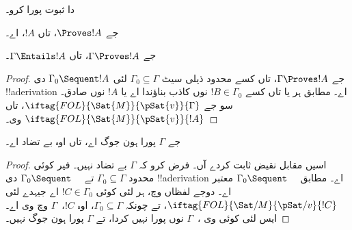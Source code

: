 \documentclass[../../../include/open-logic-section]{subfiles}
\begin{document}
\begin{prob}
 دا ثبوت پورا کرو۔
\end{prob}
\tagendprob

\begin{cor}
جے $\Proves !A$، تاں $!A$،  اے۔
\end{cor}

\begin{cor}
جے $\Gamma \Proves !A$، تاں $\Gamma \Entails !A$۔
\end{cor}

\begin{proof}
جے $\Gamma \Proves !A$، تاں کسے محدود ذیلی سیٹ $\Gamma_0 \subseteq
\Gamma$ لئی $\Gamma_0 \Sequent !A$ دی !!a{derivation} اے۔
 مطابق ہر
یا تاں کسے $!B \in \Gamma_0$ نوں کاذب بناؤندا اے یا $!A$ نوں صادق۔ سو
جے $\iftag{FOL}{\Sat{M}}{\pSat{v}}{\Gamma}$، تاں
$\iftag{FOL}{\Sat{M}}{\pSat{v}}{!A}$ وی۔
\end{proof}

\begin{cor}
جے $\Gamma$ پورا ہون جوگ اے، تاں اوہ بے تضاد اے۔
\end{cor}

\begin{proof}
اسیں مقابل نقیض ثابت کردے آں۔ فرض کرو کہ $\Gamma$ بے تضاد نہیں۔ فیر کوئی
محدود $\Gamma_0 \subseteq \Gamma$ تے $\Gamma_0 \Sequent \quad$ دی
!!a{derivation} اے۔  مطابق
$\Gamma_0 \Sequent \quad$ معتبر اے۔ دوجے لفظاں وچ، ہر
لئی کوئی $!C \in \Gamma_0$ اے جیہدے لئی
$\iftag{FOL}{\Sat/{M}}{\pSat/{v}}{!C}$، تے چونکہ $\Gamma_0
\subseteq \Gamma$، اوہ $!C$،~$\Gamma$ وچ وی اے۔ ایس لئی کوئی وی
،~$\Gamma$ نوں پورا نہیں کردا،
تے $\Gamma$ پورا ہون جوگ نہیں۔
\end{proof}
\end{document}
